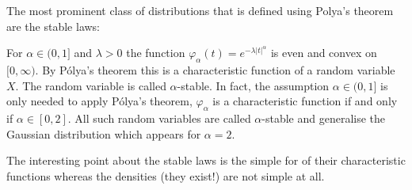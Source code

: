 The most prominent class of distributions that is defined using Polya's theorem are the stable laws:
\begin{example}\label{example:stable}
	For $\alpha\in (0,1]$ and $\lambda>0$ the function $\varphi_{\alpha}(t) = e^{- \lambda \lvert t \rvert^{\alpha}}$ is even and convex on $[0,\infty)$. By P\'olya's theorem this is a characteristic function of a random variable $X$. The random variable is called $\alpha$-stable. In fact, the assumption $\alpha\in (0,1]$ is only needed to apply P\'olya's theorem, $\varphi_\alpha$ is a characteristic function if and only if $\alpha\in [0,2]$. All such random variables are called $\alpha$-stable and generalise the Gaussian distribution which appears for $\alpha=2$.
\end{example}
The interesting point about the stable laws is the simple for of their characteristic functions whereas the densities (they exist!) are not simple at all.


	\marginpar{\textcolor{red}{Lecture 18}}


